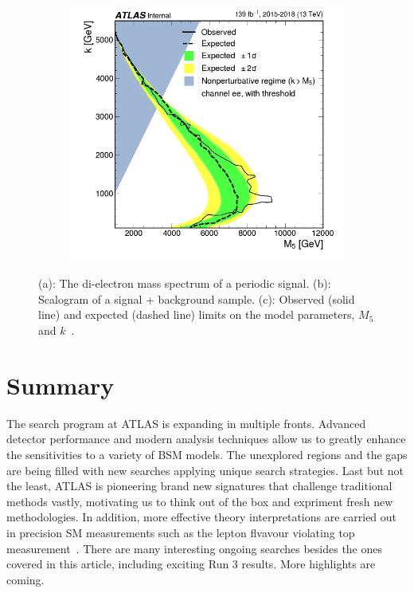 \documentclass{moriond}
\begin{document}
\begin{figure}[htp]
\begin{subfigure}[b]{0.25\textwidth}
         \label{fig:shape}
     \end{subfigure}
     \begin{subfigure}[b]{0.25\textwidth}
         \centering
         \includegraphics[width=\textwidth]{periodic}
         \label{fig:perlimits}
     \end{subfigure}
        \caption{(a): The di-electron mass spectrum of a periodic signal. (b): Scalogram of a signal + background sample. (c): Observed (solid line) and expected (dashed line) limits on the model parameters, $M_{5}$ and $k$~\cite{period}.}
        \label{fig:periodic}
\end{figure}

\section{Summary}

The search program at ATLAS is expanding in multiple fronts. Advanced detector
performance and modern analysis techniques allow us to greatly enhance the
sensitivities to a variety of BSM models. The unexplored regions and the gaps
are being filled with new searches applying unique search strategies. Last but
not the least, ATLAS is pioneering brand new signatures that challenge
traditional methods vastly, motivating us to think out of the box and expriment
fresh new methodologies. In addition, more effective theory interpretations are
carried out in precision SM measurements such as the lepton flvavour violating
top measurement~\cite{top}. There are many interesting ongoing searches besides
the ones covered in this article, including exciting Run 3 results. More
highlights are coming.       
\end{document}

